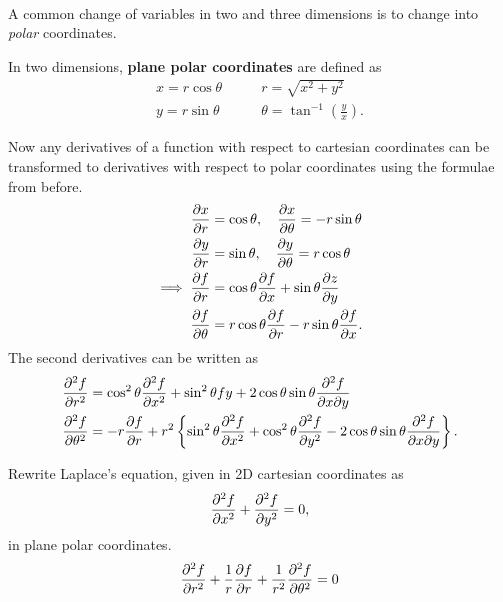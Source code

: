 \documentclass[../multivariate_calculus.tex]{subfiles}
\begin{document}
        \paragraph{}
        A common change of variables in two and three dimensions is to change into \textit{polar} coordinates.
        \begin{definition}
            In two dimensions, \textbf{plane polar coordinates} are defined as
            \begin{align}
                x=r\cos\theta\quad&\quad r=\sqrt{x^2+y^2}\\
                y=r\sin\theta\quad&\quad\theta=\tan^{-1}\left(\frac{y}{x}\right).
            \end{align}
        \end{definition}
        Now any derivatives of a function with respect to cartesian coordinates can be transformed to derivatives with respect to polar coordinates using the formulae from before.
        \begin{align}
            \frac{\partial x}{\partial r}&=\cos\theta,\quad\frac{\partial x}{\partial\theta}=-r\sin\theta\\
            \frac{\partial y}{\partial r}&=\sin\theta,\quad\frac{\partial y}{\partial\theta}=r\cos\theta\\
            \implies\frac{\partial f}{\partial r}&=\cos\theta\frac{\partial f}{\partial x}+\sin\theta\frac{\partial z}{\partial y}\\
            \frac{\partial f}{\partial\theta}&=r\cos\theta\frac{\partial f}{\partial r}-r\sin\theta\frac{\partial f}{\partial x}.
        \end{align}
        The second derivatives can be written as
        \begin{align}
            \frac{\partial^2{f}}{\partial{r}^2}&=\cos^2\theta\frac{\partial^2{f}}{\partial{x}^2}+\sin^2\theta{f}{y}+2\cos\theta\sin\theta\frac{\partial^2 f}{\partial x\partial y}\\
            \frac{\partial^2{f}}{\partial{\theta}^2}&=-r\frac{\partial f}{\partial r}+r^2\left\{\sin^2\theta\frac{\partial^2{f}}{\partial{x}^2}+\cos^2\theta\frac{\partial^2{f}}{\partial{y}^2}-2\cos\theta\sin\theta\frac{\partial^2 f}{\partial x\partial y}\right\}.
        \end{align}
        \begin{example}
            Rewrite Laplace's equation, given in 2D cartesian coordinates as
            \begin{equation}
                \frac{\partial^2{f}}{\partial{x}^2}+\frac{\partial^2{f}}{\partial{y}^2}=0,
            \end{equation}
            in plane polar coordinates.
            \begin{equation}
                \frac{\partial^2{f}}{\partial{r}^2}+\frac{1}{r}\frac{\partial f}{\partial r}+\frac{1}{r^2}\frac{\partial^2{f}}{\partial{\theta}^2}=0
            \end{equation}
        \end{example}
\end{document}
